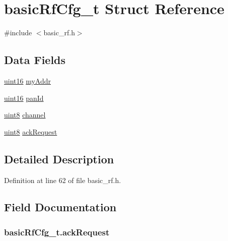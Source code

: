 \hypertarget{structbasic_rf_cfg__t}{
\section{basicRfCfg\_\-t Struct Reference}
\label{structbasic_rf_cfg__t}
}


{\ttfamily \#include $<$basic\_\-rf.h$>$}

\subsection*{Data Fields}
\begin{DoxyCompactItemize}
\item 
\hyperlink{hal__types_8h_a05f6b0ae8f6a6e135b0e290c25fe0e4e}{uint16} \hyperlink{structbasic_rf_cfg__t_ae0435b4dbf855970610280ec1697239d}{myAddr}
\item 
\hyperlink{hal__types_8h_a05f6b0ae8f6a6e135b0e290c25fe0e4e}{uint16} \hyperlink{structbasic_rf_cfg__t_a198440aa336d6c82fb0341e47d6b5184}{panId}
\item 
\hyperlink{hal__types_8h_adde6aaee8457bee49c2a92621fe22b79}{uint8} \hyperlink{structbasic_rf_cfg__t_a2230c500bdc43d6a102c30ef11d1393d}{channel}
\item 
\hyperlink{hal__types_8h_adde6aaee8457bee49c2a92621fe22b79}{uint8} \hyperlink{structbasic_rf_cfg__t_a503a69424eb7f5eec08ac5289d5f4159}{ackRequest}
\end{DoxyCompactItemize}


\subsection{Detailed Description}


Definition at line 62 of file basic\_\-rf.h.



\subsection{Field Documentation}
\hypertarget{structbasic_rf_cfg__t_a503a69424eb7f5eec08ac5289d5f4159}{
\subsubsection[{ackRequest}]{ {\bf basicRfCfg\_\-t.ackRequest}}}
\label{structbasic_rf_cfg__t_a503a69424eb7f5eec08ac5289d5f4159}


